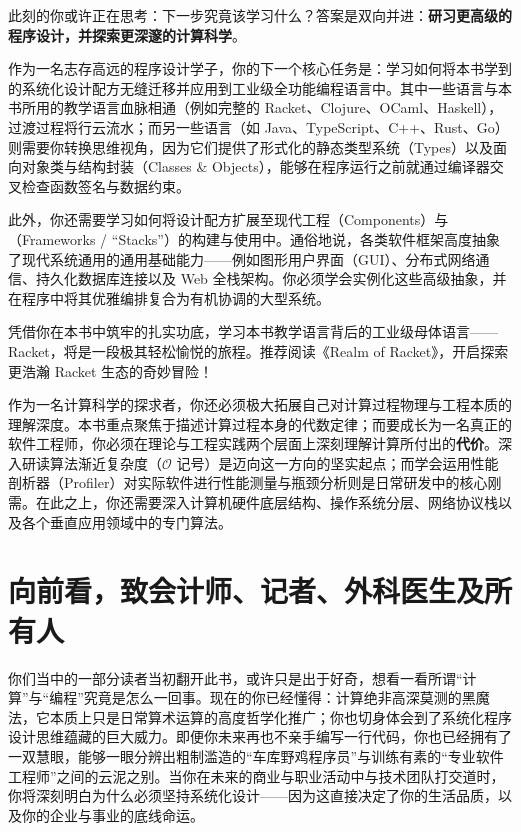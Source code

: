此刻的你或许正在思考：下一步究竟该学习什么？答案是双向并进：\textbf{研习更高级的程序设计，并探索更深邃的计算科学}。

作为一名志存高远的程序设计学子，你的下一个核心任务是：学习如何将本书学到的系统化设计配方无缝迁移并应用到工业级全功能编程语言中。其中一些语言与本书所用的教学语言血脉相通（例如完整的 Racket、Clojure、OCaml、Haskell），过渡过程将行云流水；而另一些语言（如 Java、TypeScript、C++、Rust、Go）则需要你转换思维视角，因为它们提供了形式化的静态类型系统（Types）以及面向对象类与结构封装（Classes \& Objects），能够在程序运行之前就通过编译器交叉检查函数签名与数据约束。

此外，你还需要学习如何将设计配方扩展至现代工程（Components）与（Frameworks / “Stacks”）的构建与使用中。通俗地说，各类软件框架高度抽象了现代系统通用的通用基础能力——例如图形用户界面（GUI）、分布式网络通信、持久化数据库连接以及 Web 全栈架构。你必须学会实例化这些高级抽象，并在程序中将其优雅编排复合为有机协调的大型系统。

\begin{notebox}[课外探索推荐]
凭借你在本书中筑牢的扎实功底，学习本书教学语言背后的工业级母体语言——Racket，将是一段极其轻松愉悦的旅程。推荐阅读《Realm of Racket》，开启探索更浩瀚 Racket 生态的奇妙冒险！
\end{notebox}

作为一名计算科学的探求者，你还必须极大拓展自己对计算过程物理与工程本质的理解深度。本书重点聚焦于描述计算过程本身的代数定律；而要成长为一名真正的软件工程师，你必须在理论与工程实践两个层面上深刻理解计算所付出的\textbf{代价}。深入研读算法渐近复杂度（$\mathcal{O}$ 记号）是迈向这一方向的坚实起点；而学会运用性能剖析器（Profiler）对实际软件进行性能测量与瓶颈分析则是日常研发中的核心刚需。在此之上，你还需要深入计算机硬件底层结构、操作系统分层、网络协议栈以及各个垂直应用领域中的专门算法。

\section*{向前看，致会计师、记者、外科医生及所有人}
\label{sec:epilogue_everyone}

你们当中的一部分读者当初翻开此书，或许只是出于好奇，想看一看所谓“计算”与“编程”究竟是怎么一回事。现在的你已经懂得：计算绝非高深莫测的黑魔法，它本质上只是日常算术运算的高度哲学化推广；你也切身体会到了系统化程序设计思维蕴藏的巨大威力。即便你未来再也不亲手编写一行代码，你也已经拥有了一双慧眼，能够一眼分辨出粗制滥造的“车库野鸡程序员”与训练有素的“专业软件工程师”之间的云泥之别。当你在未来的商业与职业活动中与技术团队打交道时，你将深刻明白为什么必须坚持系统化设计——因为这直接决定了你的生活品质，以及你的企业与事业的底线命运。

